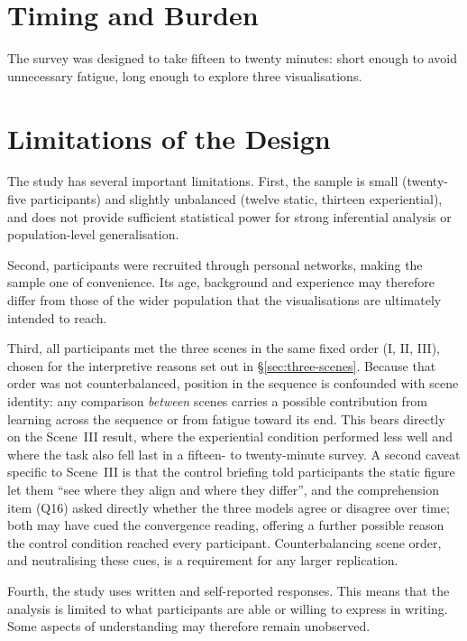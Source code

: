 \section{Timing and Burden}
\label{sec:eval-burden}

The survey was designed to take fifteen to twenty minutes: short enough to avoid unnecessary fatigue, long enough to explore three visualisations.

\section{Limitations of the Design}
\label{sec:eval-limitations}

The study has several important limitations. First, the sample is small (twenty-five participants) and slightly unbalanced (twelve static, thirteen experiential), and does not provide sufficient statistical power for strong inferential analysis or population-level generalisation.

Second, participants were recruited through personal networks, making the sample one of convenience. Its age, background and experience may therefore differ from those of the wider population that the visualisations are ultimately intended to reach.

Third, all participants met the three scenes in the same fixed order (I, II, III), chosen for the interpretive reasons set out in \S\ref{sec:three-scenes}. Because that order was not counterbalanced, position in the sequence is confounded with scene identity: any comparison \emph{between} scenes carries a possible contribution from learning across the sequence or from fatigue toward its end. This bears directly on the Scene~III result, where the experiential condition performed less well and where the task also fell last in a fifteen- to twenty-minute survey. A second caveat specific to Scene~III is that the control briefing told participants the static figure let them ``see where they align and where they differ'', and the comprehension item (Q16) asked directly whether the three models agree or disagree over time; both may have cued the convergence reading, offering a further possible reason the control condition reached every participant. Counterbalancing scene order, and neutralising these cues, is a requirement for any larger replication.

Fourth, the study uses written and self-reported responses. This means that the analysis is limited to what participants are able or willing to express in writing. Some aspects of understanding may therefore remain unobserved.

